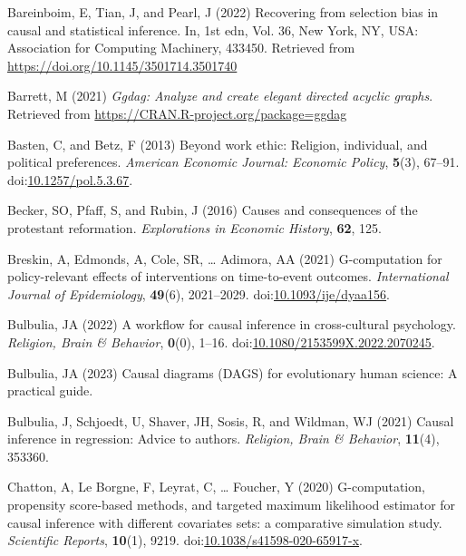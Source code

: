 \documentclass[
  singlecolumn,
  9pt]{article}
\begin{document}
\begin{CSLReferences}
Bareinboim, E, Tian, J, and Pearl, J (2022) Recovering from selection
bias in causal and statistical inference. In, 1st edn, Vol. 36, New
York, NY, USA: Association for Computing Machinery, 433450. Retrieved
from \url{https://doi.org/10.1145/3501714.3501740}

Barrett, M (2021) \emph{Ggdag: Analyze and create elegant directed
acyclic graphs}. Retrieved from
\url{https://CRAN.R-project.org/package=ggdag}

Basten, C, and Betz, F (2013) Beyond work ethic: Religion, individual,
and political preferences. \emph{American Economic Journal: Economic
Policy}, \textbf{5}(3), 67--91.
doi:\href{https://doi.org/10.1257/pol.5.3.67}{10.1257/pol.5.3.67}.

Becker, SO, Pfaff, S, and Rubin, J (2016) Causes and consequences of the
protestant reformation. \emph{Explorations in Economic History},
\textbf{62}, 125.

Breskin, A, Edmonds, A, Cole, SR, \ldots{} Adimora, AA (2021)
G-computation for policy-relevant effects of interventions on
time-to-event outcomes. \emph{International Journal of Epidemiology},
\textbf{49}(6), 2021--2029.
doi:\href{https://doi.org/10.1093/ije/dyaa156}{10.1093/ije/dyaa156}.

Bulbulia, JA (2022) A workflow for causal inference in cross-cultural
psychology. \emph{Religion, Brain \& Behavior}, \textbf{0}(0), 1--16.
doi:\href{https://doi.org/10.1080/2153599X.2022.2070245}{10.1080/2153599X.2022.2070245}.

Bulbulia, JA (2023) Causal diagrams (DAGS) for evolutionary human
science: A practical guide.

Bulbulia, J, Schjoedt, U, Shaver, JH, Sosis, R, and Wildman, WJ (2021)
Causal inference in regression: Advice to authors. \emph{Religion, Brain
\& Behavior}, \textbf{11}(4), 353360.

Chatton, A, Le Borgne, F, Leyrat, C, \ldots{} Foucher, Y (2020)
G-computation, propensity score-based methods, and targeted maximum
likelihood estimator for causal inference with different covariates
sets: a comparative simulation study. \emph{Scientific Reports},
\textbf{10}(1), 9219.
doi:\href{https://doi.org/10.1038/s41598-020-65917-x}{10.1038/s41598-020-65917-x}.


\end{CSLReferences}
\end{document}
